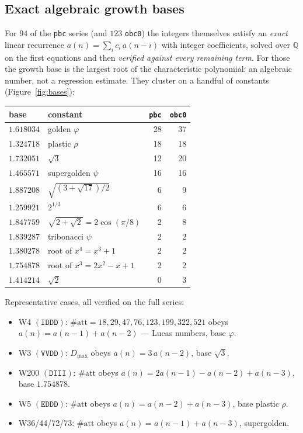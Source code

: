 \documentclass[11pt]{article}
\newcommand{\rt}[1]{\texttt{#1}}
\begin{document}
\subsection{Exact algebraic growth bases}
For $94$ of the \rt{pbc} series (and $123$ \rt{obc0}) the integers themselves
satisfy an \emph{exact} linear recurrence $a(n)=\sum_i c_i\,a(n-i)$ with integer
coefficients, solved over $\mathbb{Q}$ on the first equations and then
\emph{verified against every remaining term}. For those the growth base is the
largest root of the characteristic polynomial: an algebraic number, not a
regression estimate. They cluster on a handful of constants
(Figure~\ref{fig:bases}):
\begin{center}\small
\begin{tabular}{@{}llrr@{}}
\toprule
base & constant & \rt{pbc} & \rt{obc0} \\
\midrule
$1.618034$ & golden $\varphi$                 & 28 & 37 \\
$1.324718$ & plastic $\rho$                    & 18 & 18 \\
$1.732051$ & $\sqrt3$                          & 12 & 20 \\
$1.465571$ & supergolden $\psi$                & 16 & 16 \\
$1.887208$ & $\sqrt{(3+\sqrt{17})/2}$          &  6 &  9 \\
$1.259921$ & $2^{1/3}$                         &  6 &  6 \\
$1.847759$ & $\sqrt{2+\sqrt2}=2\cos(\pi/8)$    &  2 &  8 \\
$1.839287$ & tribonacci $\psi$                 &  2 &  2 \\
$1.380278$ & root of $x^4=x^3+1$               &  2 &  2 \\
$1.754878$ & root of $x^3=2x^2-x+1$            &  2 &  2 \\
$1.414214$ & $\sqrt2$                          &  0 &  3 \\
\bottomrule
\end{tabular}
\end{center}
Representative cases, all verified on the full series:
\begin{itemize}\itemsep2pt
  \item W4 $(\rt{IDDD})$: $\#\mathrm{att}=18,29,47,76,123,199,322,521$ obeys
  $a(n)=a(n-1)+a(n-2)$ --- Lucas numbers, base $\varphi$.
  \item W3 $(\rt{VVDD})$: $D_{\max}$ obeys $a(n)=3\,a(n-2)$, base $\sqrt3$.
  \item W200 $(\rt{DIII})$: $\#\mathrm{att}$ obeys
  $a(n)=2a(n-1)-a(n-2)+a(n-3)$, base $1.754878$.
  \item W5 $(\rt{EDDD})$: $\#\mathrm{att}$ obeys $a(n)=a(n-2)+a(n-3)$, base
  plastic $\rho$.
  \item W36/44/72/73: $\#\mathrm{att}$ obeys $a(n)=a(n-1)+a(n-3)$, supergolden.
\end{itemize}
\end{document}
